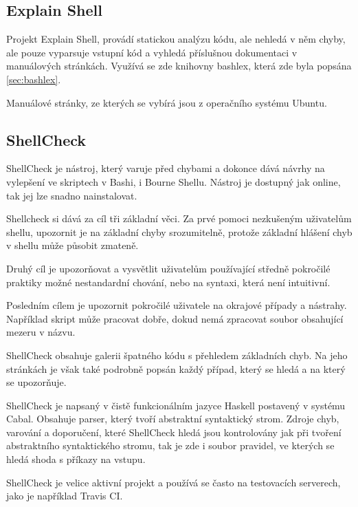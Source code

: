 \documentclass[thesis=M,czech]{FITthesis}[2012/06/26]
\begin{document}

%
%
\subsection{Explain Shell}

Projekt Explain Shell, provádí statickou analýzu kódu, ale nehledá v něm chyby, ale pouze vyparsuje vstupní kód a vyhledá příslušnou dokumentaci v manuálových stránkách. Využívá se zde knihovny bashlex, která zde byla popsána \ref{sec:bashlex}.

Manuálové stránky, ze kterých se vybírá jsou z operačního systému Ubuntu.


%
%
\subsection{ShellCheck}

ShellCheck je nástroj, který varuje před chybami a dokonce dává návrhy na vylepšení ve skriptech v Bashi, i Bourne Shellu. Nástroj je dostupný jak online, tak jej lze snadno nainstalovat.

Shellcheck si dává za cíl tři základní věci. Za prvé pomoci nezkušeným uživatelům shellu, upozornit je na základní chyby srozumitelně, protože základní hlášení chyb v shellu může působit zmateně.

Druhý cíl je upozorňovat a vysvětlit uživatelům používající středně pokročilé praktiky možné nestandardní chování, nebo na syntaxi, která není intuitivní.

Posledním cílem je upozornit pokročilé uživatele na okrajové případy a nástrahy. Například skript může pracovat dobře, dokud nemá zpracovat soubor obsahující mezeru v názvu.

ShellCheck obsahuje galerii špatného kódu s přehledem základních chyb. Na jeho stránkách je však také podrobně popsán každý případ, který se hledá a na který se upozorňuje.

ShellCheck je napsaný v čistě funkcionálním jazyce Haskell postavený v systému Cabal. Obsahuje parser, který tvoří abstraktní syntaktický strom. Zdroje chyb, varování a doporučení, které ShellCheck hledá jsou kontrolovány jak při tvoření abstraktního syntaktického stromu, tak je zde i soubor pravidel, ve kterých se hledá shoda s příkazy na vstupu.

ShellCheck je velice aktivní projekt a používá se často na testovacích serverech, jako je například Travis CI.
\end{document}
